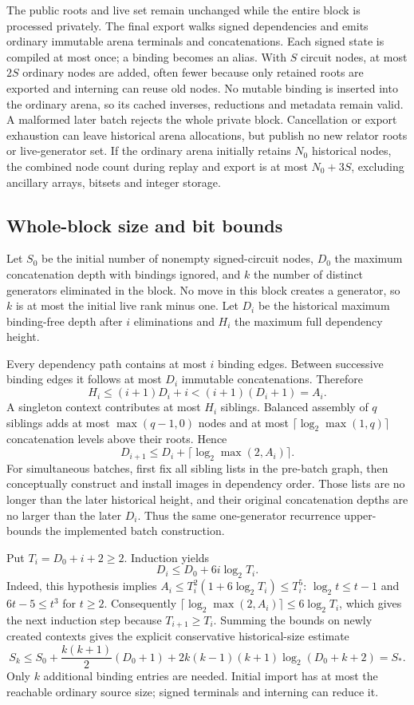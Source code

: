 The public roots and live set remain unchanged while the entire block is
processed privately. The final export walks signed dependencies and emits
ordinary immutable arena terminals and concatenations. Each signed state is
compiled at most once; a binding becomes an alias. With $S$ circuit nodes,
at most $2S$ ordinary nodes are added, often fewer because only retained roots
are exported and interning can reuse old nodes. No mutable binding is inserted
into the ordinary arena, so its cached inverses, reductions and metadata remain
valid. A malformed later batch rejects the whole private block. Cancellation
or export exhaustion can leave historical arena allocations, but publish no
new relator roots or live-generator set.
If the ordinary arena initially retains $N_0$ historical nodes, the combined
node count during replay and export is at most $N_0+3S$, excluding ancillary
arrays, bitsets and integer storage.

\subsection{Whole-block size and bit bounds}

Let $S_0$ be the initial number of nonempty signed-circuit nodes, $D_0$ the
maximum concatenation depth with bindings ignored, and $k$ the number of
distinct generators eliminated in the block. No move in this block creates
a generator, so $k$ is at most the initial live rank minus one. Let $D_i$
be the historical maximum binding-free depth after $i$ eliminations and
$H_i$ the maximum full dependency height.

Every dependency path contains at most $i$ binding edges. Between successive
binding edges it follows at most $D_i$ immutable concatenations. Therefore
\[
        H_i\le(i+1)D_i+i < (i+1)(D_i+1)=A_i.
\]
A singleton context contributes at most $H_i$ siblings. Balanced assembly of
$q$ siblings adds at most $\max(q-1,0)$ nodes and at most
$\lceil\log_2\max(1,q)\rceil$ concatenation levels above their roots. Hence
\[
 D_{i+1}\le D_i+\lceil\log_2\max(2,A_i)\rceil.
\]
For simultaneous batches, first fix all sibling lists in the pre-batch graph,
then conceptually construct and install images in dependency order. Those
lists are no longer than the later historical height, and their original
concatenation depths are no larger than the later $D_i$. Thus the same
one-generator recurrence upper-bounds the implemented batch construction.

Put $T_i=D_0+i+2\ge2$. Induction yields
\[
                 D_i\le D_0+6i\log_2 T_i.
\]
Indeed, this hypothesis implies
$A_i\le T_i^2(1+6\log_2 T_i)\le T_i^5$:
$\log_2 t\le t-1$ and $6t-5\le t^3$ for $t\ge2$.
Consequently $\lceil\log_2\max(2,A_i)\rceil\le6\log_2T_i$,
which gives the next induction step because $T_{i+1}\ge T_i$.
Summing the bounds on newly created contexts gives the explicit conservative
historical-size estimate
\[
 S_k\le S_0+\frac{k(k+1)}2(D_0+1)
       +2k(k-1)(k+1)\log_2(D_0+k+2)=S_*.
\]
Only $k$ additional binding entries are needed. Initial import has at most
the reachable ordinary source size; signed terminals and interning can reduce it.

